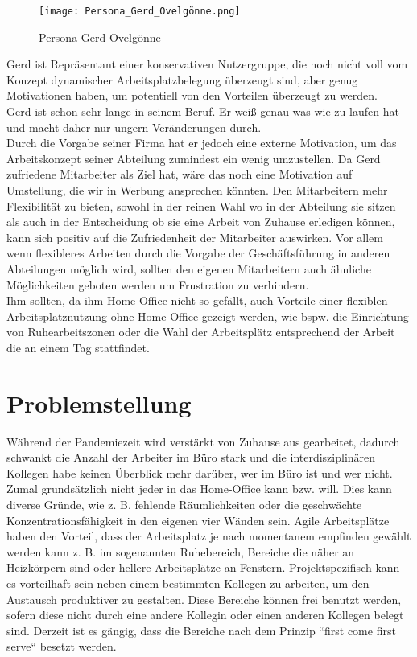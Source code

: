 \pagebreak

\begin{figure}[!h]
    \centering
    \texttt{[image: Persona\_Gerd\_Ovelgönne.png]}
    \caption{Persona Gerd Ovelgönne}
    \label{fig:PersonaGerdOvelgönne}
\end{figure}

Gerd ist Repräsentant einer konservativen Nutzergruppe, die noch nicht voll vom Konzept dynamischer Arbeitsplatzbelegung überzeugt sind, aber genug Motivationen haben, um potentiell von den Vorteilen überzeugt zu werden.
\\
Gerd ist schon sehr lange in seinem Beruf.
Er weiß genau was wie zu laufen hat und macht daher nur ungern Veränderungen durch.
\\
Durch die Vorgabe seiner Firma hat er jedoch eine externe Motivation, um das Arbeitskonzept seiner Abteilung zumindest ein wenig umzustellen.
Da Gerd zufriedene Mitarbeiter als Ziel hat, wäre das noch eine Motivation auf Umstellung, die wir in Werbung ansprechen könnten.
Den Mitarbeitern mehr Flexibilität zu bieten, sowohl in der reinen Wahl wo in der Abteilung sie sitzen als auch in der Entscheidung ob sie eine Arbeit von Zuhause erledigen können, kann sich positiv auf die Zufriedenheit der Mitarbeiter auswirken.
Vor allem wenn flexibleres Arbeiten durch die Vorgabe der Geschäftsführung in anderen Abteilungen möglich wird, sollten den eigenen Mitarbeitern auch ähnliche Möglichkeiten geboten werden um Frustration zu verhindern.
\\
Ihm sollten, da ihm Home-Office nicht so gefällt, auch Vorteile einer flexiblen Arbeitsplatznutzung ohne Home-Office gezeigt werden, wie bspw. die Einrichtung von Ruhearbeitszonen oder die Wahl der Arbeitsplätz entsprechend der Arbeit die an einem Tag stattfindet.


\section{Problemstellung}
Während der Pandemiezeit wird verstärkt von Zuhause aus gearbeitet, dadurch schwankt die Anzahl der Arbeiter im Büro stark und die interdisziplinären Kollegen habe keinen Überblick mehr darüber, wer im Büro ist und wer nicht.
Zumal grundsätzlich nicht jeder in das Home-Office kann bzw. will. 
Dies kann diverse Gründe, wie z. B. fehlende Räumlichkeiten oder die geschwächte Konzentrationsfähigkeit in den eigenen vier Wänden sein.
Agile Arbeitsplätze haben den Vorteil, dass der Arbeitsplatz je nach momentanem empfinden gewählt werden kann z. B. im sogenannten Ruhebereich, Bereiche die näher an Heizkörpern sind oder hellere Arbeitsplätze an Fenstern.
Projektspezifisch kann es vorteilhaft sein neben einem bestimmten Kollegen zu arbeiten, um den Austausch produktiver zu gestalten.
Diese Bereiche können frei benutzt werden, sofern diese nicht durch eine andere Kollegin oder einen anderen Kollegen belegt sind.
Derzeit ist es gängig, dass die Bereiche nach dem Prinzip “first come first serve“ besetzt werden. 

